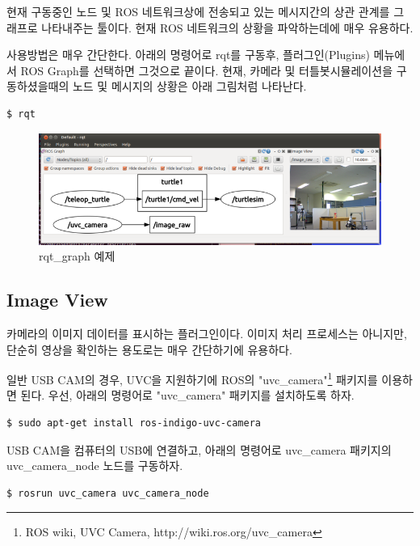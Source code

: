 현재 구동중인 노드 및 ROS 네트워크상에 전송되고 있는 메시지간의 상관 관계를 그래프로 나타내주는 툴이다. 현재 ROS 네트워크의 상황을 파악하는데에 매우 유용하다.

사용방법은 매우 간단한다. 아래의 명령어로 rqt를 구동후, 플러그인(Plugins) 메뉴에서 ROS Graph를 선택하면 그것으로 끝이다. 현재, 카메라 및 터틀봇시뮬레이션을 구동하셨을때의 노드 및 메시지의 상황은 아래 그림처럼 나타난다.

\begin{lstlisting}[language=ros]
$ rqt
\end{lstlisting}

\begin{figure}[h]
\centering\includegraphics[width=0.9\columnwidth]{pictures/chapter6/rqt_graph.png}
\caption{rqt\_graph 예제}
\end{figure}

\subsection{Image View}

카메라의 이미지 데이터를 표시하는 플러그인이다. 이미지 처리 프로세스는 아니지만, 단순히 영상을 확인하는 용도로는 매우 간단하기에 유용하다.

일반 USB CAM의 경우, UVC을 지원하기에 ROS의 "uvc\_camera"\footnote{ROS wiki, UVC Camera, http://wiki.ros.org/uvc\_camera} 패키지를 이용하면 된다. 우선, 아래의 명령어로 "uvc\_camera" 패키지를 설치하도록 하자.

\begin{lstlisting}[language=ROS]
$ sudo apt-get install ros-indigo-uvc-camera 
\end{lstlisting}

USB CAM을 컴퓨터의 USB에 연결하고, 아래의 명령어로 uvc\_camera 패키지의 uvc\_camera\_node 노드를 구동하자.

\begin{lstlisting}[language=ros]
$ rosrun uvc_camera uvc_camera_node
\end{lstlisting}

